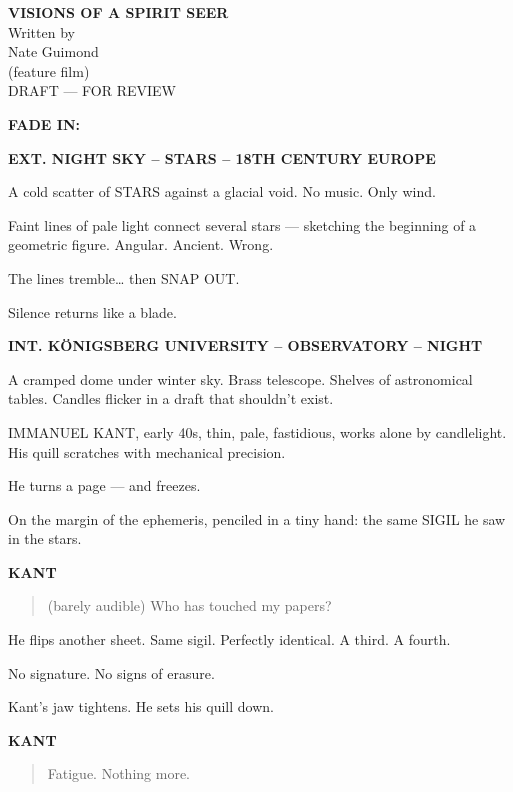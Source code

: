 \documentclass[12pt]{article}
\newcommand{\Scene}[1]{\vspace{1.2em}\textbf{#1}\vspace{0.8em}}
\newcommand{\Character}[1]{\vspace{0.8em}\textbf{#1}\vspace{0.4em}}
\newenvironment{Dialogue}{\begin{quote}\begin{RaggedRight}}{\end{RaggedRight}\end{quote}}
\newcommand{\Action}[1]{\vspace{0.4em}#1\vspace{0.4em}}
\begin{document}
\begin{center}
{\Large\bfseries VISIONS OF A SPIRIT SEER}\\[2em]
{\large Written by}\\[0.5em]
{\large Nate Guimond}\\[2em]
(feature film)\\[4em]
DRAFT — FOR REVIEW
\end{center}

\newpage


\Scene{FADE IN:}

\Scene{EXT. NIGHT SKY – STARS – 18TH CENTURY EUROPE}

\Action{A cold scatter of STARS against a glacial void. No music. Only wind.}

\Action{Faint lines of pale light connect several stars — sketching the beginning of a geometric figure. Angular. Ancient. Wrong.}

\Action{The lines tremble… then SNAP OUT.}

\Action{Silence returns like a blade.}

\Scene{INT. KÖNIGSBERG UNIVERSITY – OBSERVATORY – NIGHT}

\Action{A cramped dome under winter sky. Brass telescope. Shelves of astronomical tables. Candles flicker in a draft that shouldn't exist.}

\Action{IMMANUEL KANT, early 40s, thin, pale, fastidious, works alone by candlelight. His quill scratches with mechanical precision.}

\Action{He turns a page — and freezes.}

\Action{On the margin of the ephemeris, penciled in a tiny hand:  
the same SIGIL he saw in the stars.}

\Character{KANT}
\begin{Dialogue}
(barely audible)  
Who has touched my papers?
\end{Dialogue}

\Action{He flips another sheet. Same sigil. Perfectly identical.  
A third. A fourth.}

\Action{No signature. No signs of erasure.}

\Action{Kant's jaw tightens. He sets his quill down.}

\Character{KANT}
\begin{Dialogue}
Fatigue. Nothing more.
\end{Dialogue}
\end{document}
